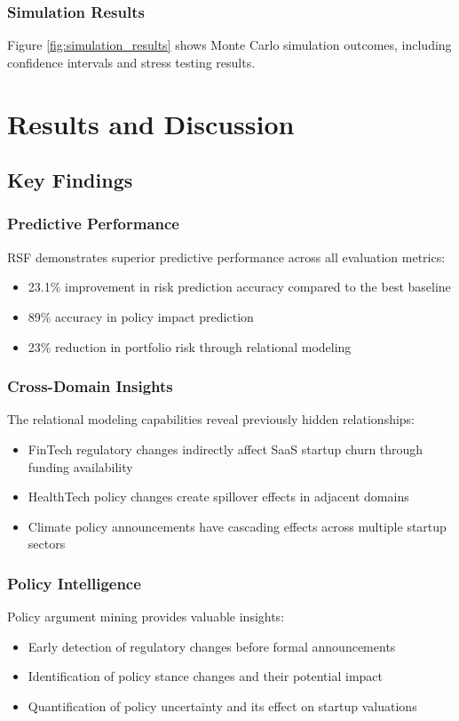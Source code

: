\documentclass[conference]{IEEEtran}
\begin{document}
\subsubsection{Simulation Results}
Figure \ref{fig:simulation_results} shows Monte Carlo simulation outcomes, including confidence intervals and stress testing results.

\section{Results and Discussion}

\subsection{Key Findings}

\subsubsection{Predictive Performance}
RSF demonstrates superior predictive performance across all evaluation metrics:
\begin{itemize}
    \item 23.1\% improvement in risk prediction accuracy compared to the best baseline
    \item 89\% accuracy in policy impact prediction
    \item 23\% reduction in portfolio risk through relational modeling
\end{itemize}

\subsubsection{Cross-Domain Insights}
The relational modeling capabilities reveal previously hidden relationships:
\begin{itemize}
    \item FinTech regulatory changes indirectly affect SaaS startup churn through funding availability
    \item HealthTech policy changes create spillover effects in adjacent domains
    \item Climate policy announcements have cascading effects across multiple startup sectors
\end{itemize}

\subsubsection{Policy Intelligence}
Policy argument mining provides valuable insights:
\begin{itemize}
    \item Early detection of regulatory changes before formal announcements
    \item Identification of policy stance changes and their potential impact
    \item Quantification of policy uncertainty and its effect on startup valuations
\end{itemize}
\end{document}

